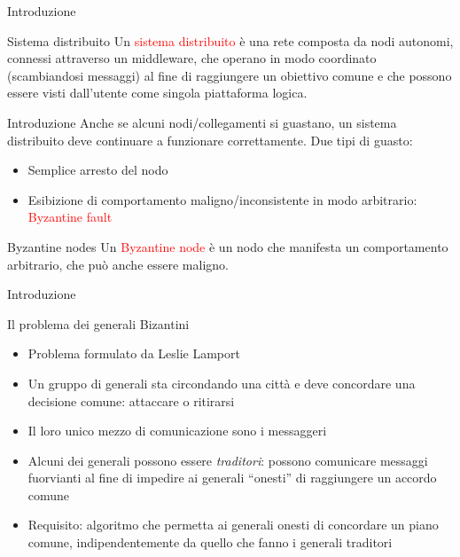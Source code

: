 \documentclass{beamer}
\newcommand\red[1]{\textcolor{red}{#1}}
\begin{document}
\begin{frame}{Introduzione}
    \begin{block}{Sistema distribuito}
    Un \textcolor{red}{sistema distribuito} è una rete composta da nodi autonomi, connessi attraverso un middleware, che operano in modo coordinato (scambiandosi messaggi) al fine di raggiungere un obiettivo comune e che possono essere visti dall'utente come singola piattaforma logica.  
    \end{block}
\end{frame}


  \begin{frame}{Introduzione}
    Anche se alcuni nodi/collegamenti si guastano, un sistema distribuito deve continuare a funzionare correttamente. Due tipi di guasto: 
    \begin{itemize}
      \item Semplice arresto del nodo
      \item Esibizione di comportamento maligno/inconsistente in modo arbitrario: \red{Byzantine fault}
    \end{itemize}

    \pause 
    \begin{block}{Byzantine nodes}
      Un \textcolor{red}{Byzantine node} è un nodo che manifesta un comportamento arbitrario, che può anche essere maligno. 
    \end{block}
  \end{frame}
  
  
  
  
  \begin{frame}{Introduzione}
        \begin{block}{Il problema dei generali Bizantini}
          \begin{itemize}
            \item Problema formulato da Leslie Lamport \cite{lamport1982byzantine}
            \item Un gruppo di generali sta circondando una città e deve concordare una decisione comune: attaccare o ritirarsi
            \item Il loro unico mezzo di comunicazione sono i messaggeri 
            \item Alcuni dei generali possono essere \emph{traditori}: possono comunicare messaggi fuorvianti al fine di impedire ai generali ``onesti'' di raggiungere un accordo comune
            \item Requisito: algoritmo che permetta ai generali onesti di concordare un piano comune, indipendentemente da quello che fanno i generali traditori
          \end{itemize}
        \end{block}
    \end{frame}
\end{document}
